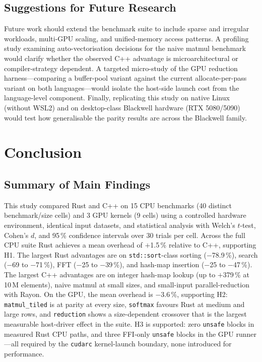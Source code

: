 \documentclass{article}
\begin{document}
\subsection{Suggestions for Future Research}

Future work should extend the benchmark suite to include sparse and
irregular workloads, multi-GPU scaling, and unified-memory access
patterns.
A profiling study examining auto-vectorisation decisions for the
naive matmul benchmark would clarify whether the observed C++
advantage is microarchitectural or compiler-strategy dependent.
A targeted micro-study of the GPU reduction harness---comparing a
buffer-pool variant against the current allocate-per-pass variant
on both languages---would isolate the host-side launch cost from the
language-level component.
Finally, replicating this study on native Linux (without WSL2) and on
desktop-class Blackwell hardware (RTX 5080/5090) would test how
generalisable the parity results are across the Blackwell family.

\section{Conclusion}

\subsection{Summary of Main Findings}

This study compared Rust and C++ on 15 CPU benchmarks (40 distinct
benchmark/size cells) and 3 GPU kernels (9 cells) using a controlled
hardware environment, identical input datasets, and statistical analysis
with Welch's $t$-test, Cohen's $d$, and 95\,\% confidence intervals over
30 trials per cell.
Across the full CPU suite Rust achieves a mean overhead of $+$1.5\,\%
relative to C++, supporting H1.
The largest Rust advantages are on \texttt{std::sort}-class sorting
($-$78.9\,\%), search ($-$69 to $-$71\,\%), FFT ($-$25 to $-$39\,\%),
and hash-map insertion ($-$25 to $-$47\,\%).
The largest C++ advantages are on integer hash-map lookup
(up to $+$379\,\% at 10\,M elements), naive matmul at small sizes,
and small-input parallel-reduction with Rayon.
On the GPU, the mean overhead is $-$3.6\,\%, supporting H2:
\texttt{matmul\_tiled} is at parity at every size, \texttt{softmax}
favours Rust at medium and large rows, and \texttt{reduction} shows a
size-dependent crossover that is the largest measurable host-driver
effect in the suite.
H3 is supported: zero \texttt{unsafe} blocks in measured Rust CPU
paths, and three FFI-only \texttt{unsafe} blocks in the GPU runner---all
required by the \texttt{cudarc} kernel-launch boundary, none introduced
for performance.
\end{document}
